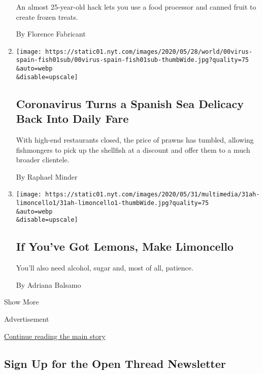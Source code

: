 \begin{enumerate}
  An almost 25-year-old hack lets you use a food processor and canned
  fruit to create frozen treats.

  By Florence Fabricant
\item
  \href{/2020/05/31/world/europe/coronavirus-prawn-spain.html}{}

  \texttt{[image: https://static01.nyt.com/images/2020/05/28/world/00virus-spain-fish01sub/00virus-spain-fish01sub-thumbWide.jpg?quality=75\\\&auto=webp\\\&disable=upscale]}

  \hypertarget{coronavirus-turns-a-spanish-sea-delicacy-back-into-daily-fare}{%
  \subsection{Coronavirus Turns a Spanish Sea Delicacy Back Into Daily
  Fare}\label{coronavirus-turns-a-spanish-sea-delicacy-back-into-daily-fare}}

  With high-end restaurants closed, the price of prawns has tumbled,
  allowing fishmongers to pick up the shellfish at a discount and offer
  them to a much broader clientele.

  By Raphael Minder
\item
  \href{/2020/05/29/at-home/coronavirus-how-to-make-limoncello.html}{}

  \texttt{[image: https://static01.nyt.com/images/2020/05/31/multimedia/31ah-limoncello1/31ah-limoncello1-thumbWide.jpg?quality=75\\\&auto=webp\\\&disable=upscale]}

  \hypertarget{if-youve-got-lemons-make-limoncello}{%
  \subsection{If You've Got Lemons, Make
  Limoncello}\label{if-youve-got-lemons-make-limoncello}}

  You'll also need alcohol, sugar and, most of all, patience.

  By Adriana Balsamo
\end{enumerate}

Show More

Advertisement

\protect\hyperlink{after-mid2}{Continue reading the main story}

\hypertarget{sign-up-for-the-open-thread-newsletter}{%
\subsection{Sign Up for the Open Thread
Newsletter}\label{sign-up-for-the-open-thread-newsletter}}

